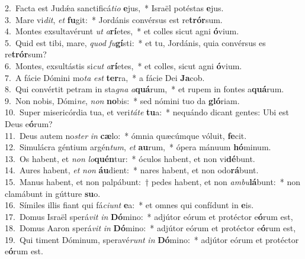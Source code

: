 {2.~}Facta est Judǽa sanctificá\textit{ti}\textit{o} \textbf{e}jus,~* Israël potéstas \textbf{e}jus.\\
{3.~}Mare vi\textit{dit}, \textit{et} \textbf{fu}git:~* Jordánis convérsus est re\textbf{trór}sum.\\
{4.~}Montes exsultavérunt \textit{ut} \textit{a}\textbf{rí}etes,~* et colles sicut agni \textbf{ó}vium.\\
{5.~}Quid est tibi, mare, \textit{quod} \textit{fu}\textbf{gí}sti:~* et tu, Jordánis, quia convérsus es re\textbf{trór}sum?\\
{6.~}Montes, exsultástis si\textit{cut} \textit{a}\textbf{rí}etes,~* et colles, sicut agni \textbf{ó}vium.\\
{7.~}A fácie Dómini mo\textit{ta} \textit{est} \textbf{ter}ra,~* a fácie Dei \textbf{Ja}cob.\\
{8.~}Qui convértit petram in sta\textit{gna} \textit{a}\textbf{quá}rum,~* et rupem in fontes a\textbf{quá}rum.\\
{9.~}Non nobis, Dómi\textit{ne}, \textit{non} \textbf{no}bis:~* sed nómini tuo da \textbf{gló}riam.\\
{10.~}Super misericórdia tua, et veri\textit{tá}\textit{te} \textbf{tu}a:~* nequándo dicant gentes: Ubi est Deus e\textbf{ó}rum?\\
{11.~}Deus autem no\textit{ster} \textit{in} \textbf{cæ}lo:~* ómnia quæcúmque vóluit, \textbf{fe}cit.\\
{12.~}Simulácra géntium argén\textit{tum}, \textit{et} \textbf{au}rum,~* ópera mánuum \textbf{hó}minum.\\
{13.~}Os habent, et \textit{non} \textit{lo}\textbf{quén}tur:~* óculos habent, et non vi\textbf{dé}bunt.\\
{14.~}Aures habent, \textit{et} \textit{non} \textbf{áu}dient:~* nares habent, et non odo\textbf{rá}bunt.\\
{15.~}Manus habent, et non palpábunt:~† pedes habent, et non \textit{am}\textit{bu}\textbf{lá}bunt:~* non clamábunt in gútture \textbf{su}o.\\
{16.~}Símiles illis fiant qui fá\textit{ci}\textit{unt} \textbf{e}a:~* et omnes qui confídunt in \textbf{e}is.\\
{17.~}Domus Israël sperá\textit{vit} \textit{in} \textbf{Dó}mino:~* adjútor eórum et protéctor e\textbf{ó}rum est,\\
{18.~}Domus Aaron sperá\textit{vit} \textit{in} \textbf{Dó}mino:~* adjútor eórum et protéctor e\textbf{ó}rum est,\\
{19.~}Qui timent Dóminum, speravé\textit{runt} \textit{in} \textbf{Dó}mino:~* adjútor eórum et protéctor e\textbf{ó}rum est.\\
